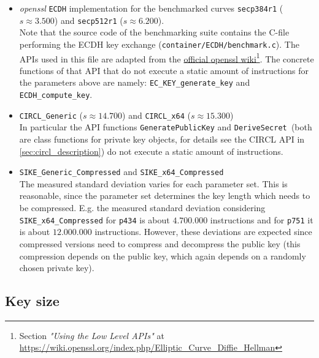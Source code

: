 \begin{itemize}
\item \textit{\gls{openssl}} \texttt{\gls{ECDH}} implementation for the benchmarked curves \texttt{secp384r1} ($s\approx3.500$) and \texttt{secp512r1} ($s\approx6.200$).\\
Note that the source code of the benchmarking suite contains the C-file performing the \gls{ECDH} key exchange (\texttt{container/ECDH/benchmark.c}). The APIs used in this file are adapted from the \href{https://wiki.openssl.org/index.php/Elliptic\_Curve\_Diffie\_Hellman}{official \gls{openssl} wiki}\footnote{Section \textit{"Using the Low Level APIs"} at \url{https://wiki.openssl.org/index.php/Elliptic\_Curve\_Diffie\_Hellman}}. The concrete functions of that API that do not execute a static amount of instructions for the parameters above are namely: \texttt{EC\_KEY\_generate\_key} and \texttt{ECDH\_compute\_key}.
\item \texttt{\gls{CIRCL}\_Generic} ($s\approx14.700$) and \texttt{\gls{CIRCL}\_x64} ($s\approx15.300$)\\
In particular the API functions \texttt{GeneratePublicKey} and \texttt{DeriveSecret }(both are class functions for private key objects, for details see the \gls{CIRCL} API in \autoref{sec:circl_description}) do not execute a static amount of instructions.
\item \texttt{\gls{SIKE}\_Generic\_Compressed} and \texttt{\gls{SIKE}\_x64\_Compressed}\\
The measured standard deviation varies for each parameter set. This is reasonable, since the parameter set determines the key length which needs to be compressed. E.g. the measured standard deviation considering \texttt{\gls{SIKE}\_x64\_Compressed} for \texttt{p434} is about $4.700.000$ instructions and for \texttt{p751} it is about $12.000.000$ instructions. 
However, these deviations are expected since compressed versions need to compress and decompress the public key (this compression depends on the public key, which again depends on a randomly chosen private key). 
\end{itemize}

\subsection{Key size}\label{sec:analysis_security_keys}

